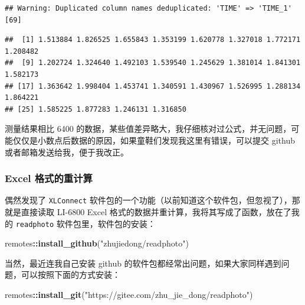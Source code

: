 \documentclass[
]{krantz}
\makeatletter
\newenvironment{Shaded}{\begin{snugshade}}{\end{snugshade}}
\newcommand{\KeywordTok}[1]{\textcolor[rgb]{0.13,0.29,0.53}{\textbf{#1}}}
\newcommand{\NormalTok}[1]{#1}
\newcommand{\OperatorTok}[1]{\textcolor[rgb]{0.81,0.36,0.00}{\textbf{#1}}}
\newcommand{\StringTok}[1]{\textcolor[rgb]{0.31,0.60,0.02}{#1}}
\newenvironment{kframe}{%
\medskip{}
\setlength{\fboxsep}{.8em}
 \def\at@end@of@kframe{}%
 \ifinner\ifhmode%
  \def\at@end@of@kframe{\end{minipage}}%
  \begin{minipage}{\columnwidth}%
 \fi\fi%
 \def\FrameCommand##1{\hskip\@totalleftmargin \hskip-\fboxsep
 \colorbox{shadecolor}{##1}\hskip-\fboxsep
     \hskip-\linewidth \hskip-\@totalleftmargin \hskip\columnwidth}%
 \MakeFramed {\advance\hsize-\width
   \@totalleftmargin\z@ \linewidth\hsize
   \@setminipage}}%
 {\par\unskip\endMakeFramed%
 \at@end@of@kframe}
\renewenvironment{Shaded}{\begin{kframe}}{\end{kframe}}
\makeatother
\begin{document}
\begin{verbatim}
## Warning: Duplicated column names deduplicated: 'TIME' => 'TIME_1' [69]
\end{verbatim}

\begin{Shaded}
\end{Shaded}

\begin{verbatim}
##  [1] 1.513884 1.826525 1.655843 1.353199 1.620778 1.327018 1.772171 1.208482
##  [9] 1.202724 1.324640 1.492103 1.539540 1.245629 1.381014 1.841301 1.582173
## [17] 1.363642 1.998404 1.453741 1.340591 1.430967 1.526995 1.288134 1.864221
## [25] 1.585225 1.877283 1.246131 1.316850
\end{verbatim}

测量结果相比 6400 的数据，某些值差异略大，我仔细核对过公式，并无问题，可能仅仅是小数点后数据的原因，如果童鞋们发现我这里有错误，可以提交 github 或者邮箱发送给我，便于我改正。

\hypertarget{excel-recompute-68}{%
\subsubsection{Excel 格式的重计算}\label{excel-recompute-68}}

偶然发现了 \texttt{XLConnect} 软件包的一个功能（以前知道这个软件包，但忽视了），那就是直接读取 LI-6800 Excel 格式的数据并重计算，我将其写成了函数，放在了我的 \texttt{readphoto} 软件包里，软件包的安装：

\begin{Shaded}
\begin{Highlighting}[]
\NormalTok{remotes}\OperatorTok{::}\KeywordTok{install_github}\NormalTok{(}\StringTok{"zhujiedong/readphoto"}\NormalTok{)}
\end{Highlighting}
\end{Shaded}

当然，最近连我自己安装 github 的软件包都经常出问题，如果大家同样遇到问题，可以按照下面的方式安装：

\begin{Shaded}
\begin{Highlighting}[]
\NormalTok{remotes}\OperatorTok{::}\KeywordTok{install_git}\NormalTok{(}\StringTok{"https://gitee.com/zhu_jie_dong/readphoto"}\NormalTok{)}
\end{Highlighting}
\end{Shaded}
\end{document}
